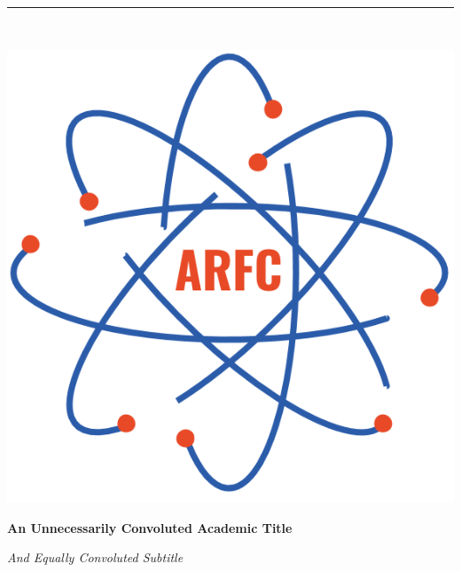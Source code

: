 \begin{titlepage} %
    \newcommand{\HRule}{\rule{\linewidth}{0.5mm}} %
    
    \center %

    
    \HRule\\[0.2cm]
    
     \begin{minipage}{0.4\textwidth}
        \includegraphics[width=\textwidth]{arfc-logo.png}
        \end{minipage}%
        \begin{minipage}{0.6\textwidth}
        {\begin{flushright}\huge\bfseries An Unnecessarily Convoluted Academic Title\end{flushright}}
        {\begin{flushright}\large\textit{And Equally Convoluted Subtitle}\end{flushright}}

        \end{minipage}


\end{titlepage}
